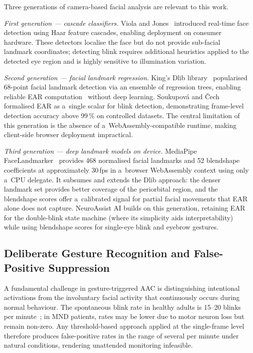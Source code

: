 Three generations of camera-based facial analysis are relevant to this work.

\emph{First generation — cascade classifiers.} Viola and Jones~\cite{violajones2004}
introduced real-time face detection using Haar feature cascades, enabling deployment on
consumer hardware. These detectors localise the face but do not provide sub-facial
landmark coordinates; detecting blink requires additional heuristics applied to the
detected eye region and is highly sensitive to illumination variation.

\emph{Second generation — facial landmark regression.} King's Dlib library~\cite{king2009dlib}
popularised 68-point facial landmark detection via an ensemble of regression trees, enabling
reliable EAR computation~\cite{soukupova2016} without deep learning. Soukupov{\'a} and
{\v{C}}ech~\cite{soukupova2016} formalised EAR as a~single scalar for blink detection,
demonstrating frame-level detection accuracy above 99\,\% on controlled datasets. The
central limitation of this generation is the absence of a~WebAssembly-compatible
runtime, making client-side browser deployment impractical.

\emph{Third generation — deep landmark models on device.} MediaPipe
FaceLandmarker~\cite{lugaresi2019mediapipe} provides 468 normalised facial landmarks and
52 blendshape coefficients at approximately 30\,fps in a~browser WebAssembly context
using only a~CPU delegate. It subsumes and extends the Dlib approach: the denser
landmark set provides better coverage of the periorbital region, and the blendshape
scores offer a~calibrated signal for partial facial movements that EAR alone does not
capture. NeuroAssist AI builds on this generation, retaining EAR for the double-blink
state machine (where its simplicity aids interpretability) while using blendshape scores
for single-eye blink and eyebrow gestures.

\subsection{Deliberate Gesture Recognition and False-Positive Suppression}

A fundamental challenge in gesture-triggered AAC is distinguishing intentional
activations from the involuntary facial activity that continuously occurs during normal
behaviour. The spontaneous blink rate in healthy adults is 15--20 blinks per
minute~\cite{bentivoglio1997}; in MND patients, rates may be lower due to motor neuron
loss but remain non-zero. Any threshold-based approach applied at the single-frame level
therefore produces false-positive rates in the range of several per minute under natural
conditions, rendering unattended monitoring infeasible.

